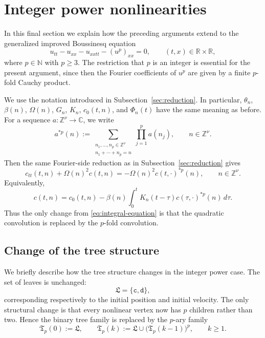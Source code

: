 \documentclass[12pt,reqno,tbtags]{amsart}
\newcommand\1{\mathbbm{1}}
\begin{document}
\section{Integer power nonlinearities}\label{sec:general-power}

In this final section we explain how the preceding arguments extend to the
generalized improved Boussinesq equation
\begin{equation}\label{eq:gp-main}
    u_{tt}-u_{xx}-u_{xxtt}-(u^p)_{xx}=0,
    \qquad (t,x)\in\mathbb R\times\mathbb R,
\end{equation}
where
$
    p\in\mathbb N$ with $p\ge3.$
The restriction that $p$ is an integer is essential for the present argument, since
then the Fourier coefficients of $u^p$ are given by a finite $p$-fold Cauchy product.

We use the notation introduced in Subsection~\ref{sec:reduction}. In particular,
$\theta_n$, $\beta(n)$, $\Omega(n)$, $G_n$, $K_n$, $c_0(t,n)$, and $\Phi_n(t)$ have
the same meaning as before. For a sequence $a:\mathbb Z^\nu\to\mathbb C$, we write
\[
a^{*p}(n)
:=
\sum_{\substack{n_1,\ldots,n_p\in\mathbb Z^\nu\\
n_1+\cdots+n_p=n}}
\prod_{j=1}^{p}a(n_j),
\qquad n\in\mathbb Z^\nu .
\]
Then the same Fourier-side reduction as in Subsection~\ref{sec:reduction} gives
\begin{equation}\label{eq:gp-ode}
c_{tt}(t,n)+\Omega(n)^2c(t,n)
=
-\Omega(n)^2c(t,\cdot)^{*p}(n),
\qquad n\in\mathbb Z^\nu .
\end{equation}
Equivalently,
\begin{equation}\label{eq:gp-integral}
c(t,n)
=
c_0(t,n)
-
\beta(n)\int_0^t K_n(t-\tau)c(\tau,\cdot)^{*p}(n)\,d\tau .
\end{equation}
Thus the only change from \eqref{eq:integral-equation} is that the quadratic
convolution is replaced by the $p$-fold convolution.

\subsection{Change of the tree structure}\label{subsec:p-ary-tree}

We briefly describe how the tree structure changes in the integer power case. The
set of leaves is unchanged:
\[
    \mathfrak L=\{\mathtt c,\mathtt d\},
\]
corresponding respectively to the initial position and initial velocity. The only
structural change is that every nonlinear vertex now has $p$ children rather than
two. Hence the binary tree family is replaced by the $p$-ary family
\[
\mathfrak T_p(0):=\mathfrak L,
\qquad
\mathfrak T_p(k):=\mathfrak L\cup\bigl(\mathfrak T_p(k-1)\bigr)^p,
\qquad k\ge1.
\]
\end{document}
